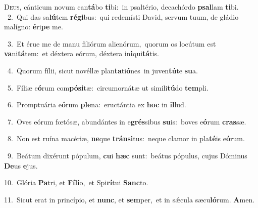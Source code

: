 \lettrine{\initial\textcolor{\initialcolor}{D}}{eus,} cánticum novum can\-\textbf{tá}\-bo \textbf{ti}\-bi:~\star in psaltério, decachórdo \textbf{psal}\-lam \textbf{ti}\-bi.\\
{\numbfont\textcolor{\numbcolor}{~2.}}~Qui das sa\-\textbf{lú}\-tem \textbf{ré}\-\textbf{gi}bus:~\star qui redemísti David, servum tuum, de gládio malígno: \textbf{é}\-ri\textbf{pe} me.\par
{\numbfont\textcolor{\numbcolor}{~3.}}~Et érue me de manu filiórum alienórum,~\dagger quorum os locútum est \textbf{va}\-ni\-\textbf{tá}\-tem:~\star et déxtera eórum, déxtera in\-\textbf{i}\-qui\-\textbf{tá}\-tis.\par
{\numbfont\textcolor{\numbcolor}{~4.}}~Quorum fílii, sicut novéllæ plan\-\textbf{ta}\-ti\-\textbf{ó}\-nes~\star in juven\-\textbf{tú}\-te \textbf{su}\-a.\par
{\numbfont\textcolor{\numbcolor}{~5.}}~Fíliæ e\-\textbf{ó}\-rum com\-\textbf{pó}\-\textbf{si}tæ:~\star circumornátæ ut simili\-\textbf{tú}\-do \textbf{tem}\-pli.\par
{\numbfont\textcolor{\numbcolor}{~6.}}~Promptuária e\-\textbf{ó}\-rum \textbf{ple}\-na:~\star eructántia ex \textbf{hoc} in \textbf{il}\-lud.\par
{\numbfont\textcolor{\numbcolor}{~7.}}~Oves eórum fœtósæ, abundántes in e\-\textbf{grés}\-sibus \textbf{su}\-is:~\star boves e\-\textbf{ó}\-rum \textbf{cras}\-sæ.\par
{\numbfont\textcolor{\numbcolor}{~8.}}~Non est ruína macériæ, \textbf{ne}\-que \textbf{tráns}\-\textbf{i}tus:~\star neque clamor in pla\-\textbf{té}\-is e\-\textbf{ó}\-rum.\par
{\numbfont\textcolor{\numbcolor}{~9.}}~Beátum dixérunt pópulum, \textbf{cu}\-i \textbf{hæc} sunt:~\star beátus pópulus, cujus Dóminus \textbf{De}\-us \textbf{e}\-jus.\par
{\numbfont\textcolor{\numbcolor}{10.}}~Glória \textbf{Pa}\-tri, et \textbf{Fí}\-\textbf{li}o,~\star et Spi\-\textbf{rí}\-tui \textbf{Sanc}\-to.\par
{\numbfont\textcolor{\numbcolor}{11.}}~Sicut erat in princípio, et \textbf{nunc}\-, et \textbf{sem}\-per,~\star et in sǽcula sæcu\-\textbf{ló}\-rum. \textbf{A}\-men.\par
